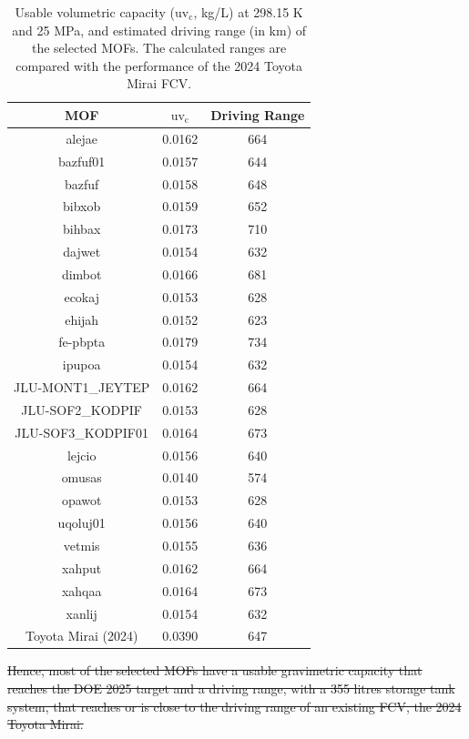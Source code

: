 \documentclass[review]{elsarticle}
\newcommand{\uvc}{\mathrm{uv_c}}
\begin{document}
{\begin{table}[H]
\begin{center}
\caption{\noindent
\label{drivingrange} 
Usable volumetric capacity ($\uvc$, kg/L) at 298.15 K and 25 MPa, and estimated driving range (in km) of the selected MOFs. The calculated ranges are compared with the performance of the 2024 Toyota Mirai FCV.}
        \begin{tabular}{ccc}
\hline
\textbf{MOF} & \textbf{$\uvc$} & \textbf{Driving Range}\\
\hline
alejae & 0.0162 & 664 \\
bazfuf01 & 0.0157 & 644 \\
bazfuf & 0.0158 & 648 \\
bibxob & 0.0159 & 652 \\
bihbax & 0.0173 & 710 \\
dajwet & 0.0154 & 632 \\
dimbot & 0.0166 & 681 \\
ecokaj & 0.0153 & 628 \\
ehijah & 0.0152 & 623 \\
fe-pbpta & 0.0179 & 734 \\
ipupoa & 0.0154 & 632 \\
JLU-MONT1\_JEYTEP & 0.0162 & 664 \\
JLU-SOF2\_KODPIF & 0.0153 & 628 \\
JLU-SOF3\_KODPIF01 & 0.0164 & 673 \\
lejcio & 0.0156 & 640 \\
omusas & 0.0140 & 574 \\
opawot & 0.0153 & 628 \\
uqoluj01 & 0.0156 & 640 \\
vetmis & 0.0155 & 636 \\
xahput & 0.0162 & 664 \\
xahqaa & 0.0164 & 673 \\
xanlij & 0.0154 & 632 \\
\hline
Toyota Mirai (2024) & 0.0390 & 647 \\
\hline
\end{tabular}
\end{center}
\end{table}

\sout{Hence, most of the selected MOFs have a usable gravimetric capacity that reaches the DOE 2025 target and a driving range, with a 355 litres storage tank system, that reaches or is close to the driving range of an existing FCV, the 2024 Toyota Mirai.}

}
\end{document}
